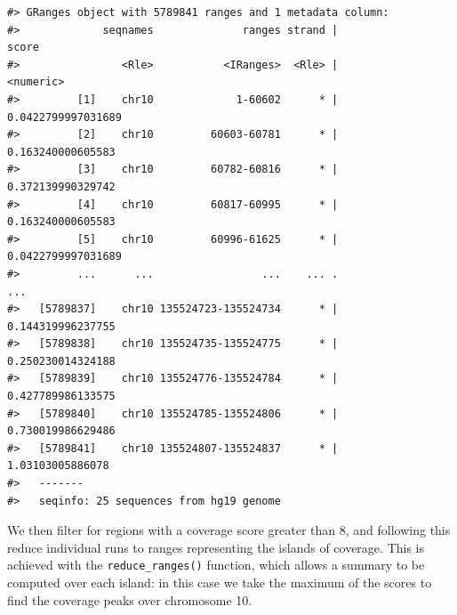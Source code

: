 \documentclass[]{article}
\newenvironment{Shaded}{\begin{snugshade}}{\end{snugshade}}
\newcommand{\KeywordTok}[1]{\textcolor[rgb]{0.13,0.29,0.53}{\textbf{#1}}}
\newcommand{\DataTypeTok}[1]{\textcolor[rgb]{0.13,0.29,0.53}{#1}}
\newcommand{\DecValTok}[1]{\textcolor[rgb]{0.00,0.00,0.81}{#1}}
\newcommand{\StringTok}[1]{\textcolor[rgb]{0.31,0.60,0.02}{#1}}
\newcommand{\OperatorTok}[1]{\textcolor[rgb]{0.81,0.36,0.00}{\textbf{#1}}}
\newcommand{\NormalTok}[1]{#1}
\begin{document}
\begin{Shaded}
\end{Shaded}

\begin{verbatim}
#> GRanges object with 5789841 ranges and 1 metadata column:
#>             seqnames              ranges strand |              score
#>                <Rle>           <IRanges>  <Rle> |          <numeric>
#>         [1]    chr10             1-60602      * | 0.0422799997031689
#>         [2]    chr10         60603-60781      * |  0.163240000605583
#>         [3]    chr10         60782-60816      * |  0.372139990329742
#>         [4]    chr10         60817-60995      * |  0.163240000605583
#>         [5]    chr10         60996-61625      * | 0.0422799997031689
#>         ...      ...                 ...    ... .                ...
#>   [5789837]    chr10 135524723-135524734      * |  0.144319996237755
#>   [5789838]    chr10 135524735-135524775      * |  0.250230014324188
#>   [5789839]    chr10 135524776-135524784      * |  0.427789986133575
#>   [5789840]    chr10 135524785-135524806      * |  0.730019986629486
#>   [5789841]    chr10 135524807-135524837      * |   1.03103005886078
#>   -------
#>   seqinfo: 25 sequences from hg19 genome
\end{verbatim}

We then filter for regions with a coverage score greater than 8, and
following this reduce individual runs to ranges representing the islands
of coverage. This is achieved with the \texttt{reduce\_ranges()}
function, which allows a summary to be computed over each island: in
this case we take the maximum of the scores to find the coverage peaks
over chromosome 10.

\begin{Shaded}
\end{Shaded}
\end{document}

